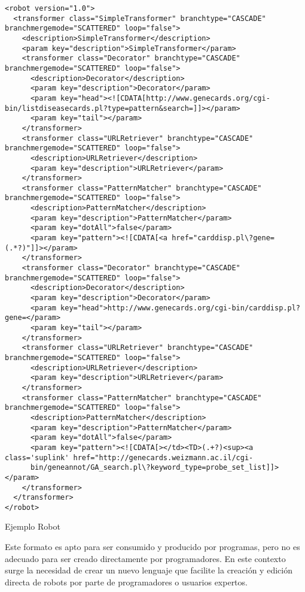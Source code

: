 \begin{table}[!hbp]
  \lstset{language=XML}
  \tiny{
  \begin{lstlisting}
<robot version="1.0">
  <transformer class="SimpleTransformer" branchtype="CASCADE" branchmergemode="SCATTERED" loop="false">
    <description>SimpleTransformer</description>
    <param key="description">SimpleTransformer</param>
    <transformer class="Decorator" branchtype="CASCADE" branchmergemode="SCATTERED" loop="false">
      <description>Decorator</description>
      <param key="description">Decorator</param>
      <param key="head"><![CDATA[http://www.genecards.org/cgi-bin/listdiseasecards.pl?type=pattern&search=]]></param>
      <param key="tail"></param>
    </transformer>
    <transformer class="URLRetriever" branchtype="CASCADE" branchmergemode="SCATTERED" loop="false">
      <description>URLRetriever</description>
      <param key="description">URLRetriever</param>
    </transformer>
    <transformer class="PatternMatcher" branchtype="CASCADE" branchmergemode="SCATTERED" loop="false">
      <description>PatternMatcher</description>
      <param key="description">PatternMatcher</param>
      <param key="dotAll">false</param>
      <param key="pattern"><![CDATA[<a href="carddisp.pl\?gene=(.*?)"]]></param>
    </transformer>
    <transformer class="Decorator" branchtype="CASCADE" branchmergemode="SCATTERED" loop="false">
      <description>Decorator</description>
      <param key="description">Decorator</param>
      <param key="head">http://www.genecards.org/cgi-bin/carddisp.pl?gene=</param>
      <param key="tail"></param>
    </transformer>
    <transformer class="URLRetriever" branchtype="CASCADE" branchmergemode="SCATTERED" loop="false">
      <description>URLRetriever</description>
      <param key="description">URLRetriever</param>
    </transformer>
    <transformer class="PatternMatcher" branchtype="CASCADE" branchmergemode="SCATTERED" loop="false">
      <description>PatternMatcher</description>
      <param key="description">PatternMatcher</param>
      <param key="dotAll">false</param>
      <param key="pattern"><![CDATA[></td><TD>(.+?)<sup><a class='suplink' href="http://genecards.weizmann.ac.il/cgi-
      bin/geneannot/GA_search.pl\?keyword_type=probe_set_list]]></param>
    </transformer>
  </transformer>
</robot>
  \end{lstlisting}
  }
  \caption{Ejemplo Robot}
  \label{robot_ejemplo}
\end{table}

Este formato es apto para ser consumido y producido por programas,
pero no es adecuado para ser creado directamente por programadores. En
este contexto surge la necesidad de crear un nuevo lenguaje que
facilite la creación y edición directa de robots por parte de
programadores o usuarios expertos.

